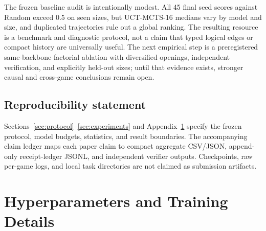 \documentclass[10pt,letterpaper]{article}
\begin{document}
The frozen baseline audit is intentionally modest. All 45 final seed scores
against Random exceed 0.5 on seen sizes, but UCT-MCTS-16 medians vary by model
and size, and duplicated trajectories rule out a global ranking. The resulting
resource is a benchmark and diagnostic protocol, not a claim that typed
logical edges or compact history are universally useful. The next empirical
step is a preregistered same-backbone factorial ablation with diversified
openings, independent verification, and explicitly held-out sizes; until that
evidence exists, stronger causal and cross-game conclusions remain open.

\subsection*{Reproducibility statement}
Sections~\ref{sec:protocol}--\ref{sec:experiments} and
Appendix~\ref{app:hyperparameters} specify the frozen protocol, model budgets,
statistics, and result boundaries. The accompanying claim ledger maps each
paper claim to compact aggregate CSV/JSON, append-only receipt-ledger JSONL,
and independent verifier outputs. Checkpoints, raw per-game logs, and local
task directories are not claimed as submission artifacts.




\appendix
\small

\section{Hyperparameters and Training Details}
\label{app:hyperparameters}
\end{document}
